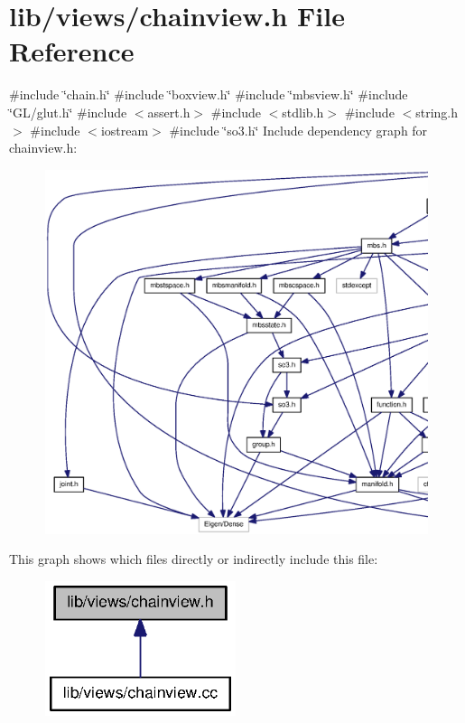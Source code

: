 \section{lib/views/chainview.h \-File \-Reference}
\label{chainview_8h}
{\ttfamily \#include \char`\"{}chain.\-h\char`\"{}}\*
{\ttfamily \#include \char`\"{}boxview.\-h\char`\"{}}\*
{\ttfamily \#include \char`\"{}mbsview.\-h\char`\"{}}\*
{\ttfamily \#include \char`\"{}\-G\-L/glut.\-h\char`\"{}}\*
{\ttfamily \#include $<$assert.\-h$>$}\*
{\ttfamily \#include $<$stdlib.\-h$>$}\*
{\ttfamily \#include $<$string.\-h$>$}\*
{\ttfamily \#include $<$iostream$>$}\*
{\ttfamily \#include \char`\"{}so3.\-h\char`\"{}}\*
\-Include dependency graph for chainview.\-h\-:
\nopagebreak
\begin{figure}[H]
\begin{center}
\leavevmode
\includegraphics[width=350pt]{chainview_8h__incl}
\end{center}
\end{figure}
\-This graph shows which files directly or indirectly include this file\-:
\nopagebreak
\begin{figure}[H]
\begin{center}
\leavevmode
\includegraphics[width=158pt]{chainview_8h__dep__incl}
\end{center}
\end{figure}
